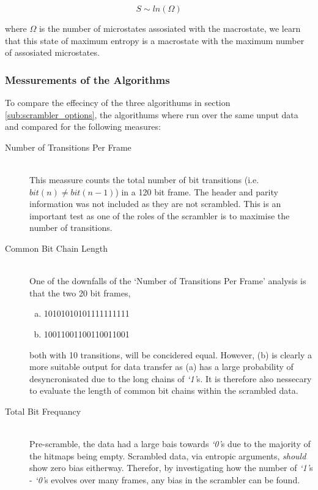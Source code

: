 		\begin{equation}
			S \sim ln(\Omega)
			\label{eqn:boltzman}
		\end{equation}

		where $\Omega$ is the number of microstates assosiated with the macrostate, we learn that this state of maximum entropy is a macrostate with the maximum number of assosiated microstates.

		\subsubsection{Messurements of the Algorithms} 
		\label{subsub:messurements_of_the_algorithms}

			To compare the effecincy of the three algorithums in section \ref{sub:scrambler_options}, the algorithums where run over the same unput data and compared for the following measures:

			\begin{description}
				\item[Number of Transitions Per Frame] \hfill \\
					This meassure counts the total number of bit transitions (i.e. $bit(n) \neq bit(n-1)$) in a 120 bit frame. 
					The header and parity information was not included as they are not scrambled.
					This is an important test as one of the roles of the scrambler is to maximise the number of transitions.

				\item[Common Bit Chain Length] \hfill \\
					One of the downfalls of the `Number of Transitions Per Frame' analysis is that the two 20 bit frames,

					\begin{enumerate}[a)]
						\item \textsc{10101010101111111111}
						\item \textsc{10011001100110011001}
					\end{enumerate}

					both with 10 transitions, will be concidered equal. However, (b) is clearly a more suitable output for data transfer as (a) has a large probability of desyncronisated due to the long chains of \textit{`1'}s.
					It is therefore also nessecary to evaluate the length of common bit chains within the scrambled data. 

				\item[Total Bit Frequancy] \hfill \\
					Pre-scramble, the data had a large bais towards \textit{`0'}s due to the majority of the hitmaps being empty.
					Scrambled data, via entropic arguments, \textit{should} show zero bias eitherway.
					Therefor, by investigating how the number of \textit{`1'}s - \textit{`0'}s evolves over many frames, any bias in the scrambler can be found.

			\end{description}	

